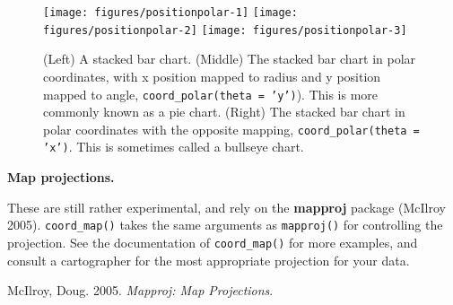 \begin{Shaded}
\begin{Highlighting}[]
\StringTok{ }\NormalTok{(} \NormalTok{(}\NormalTok{), } 
\StringTok{  }\NormalTok{(} \NormalTok{))}
\StringTok{ }\NormalTok{(} \NormalTok{)}

\StringTok{ }\NormalTok{()}
\end{Highlighting}
\end{Shaded}

\begin{figure}
\texttt{[image: figures/positionpolar-1]} \texttt{[image: figures/positionpolar-2]} \texttt{[image: figures/positionpolar-3]} \caption{(Left) A stacked bar chart.  (Middle) The stacked bar chart in polar coordinates, with x position mapped to radius and y position mapped to angle, \texttt{coord\_polar(theta = 'y')}).  This is more commonly known as a pie chart.  (Right) The stacked bar chart in polar coordinates with the opposite mapping, \texttt{coord\_polar(theta = 'x')}. This is sometimes called a bullseye chart.\label{fig:polar}}
\end{figure}

\textbf{Map projections.}

These are still rather experimental, and rely on the \textbf{mapproj}
package (McIlroy 2005). \texttt{coord\_map()} takes the same arguments
as \texttt{mapproj()} for controlling the projection. See the
documentation of \texttt{coord\_map()} for more examples, and consult a
cartographer for the most appropriate projection for your data.
 

McIlroy, Doug. 2005. \emph{Mapproj: Map Projections}.
